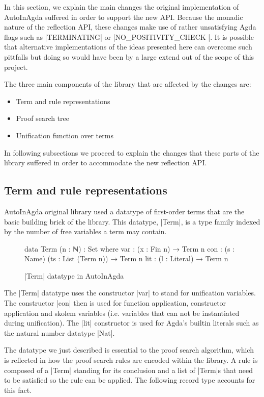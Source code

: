 \documentclass[a4paper]{article}
\begin{document}
In this section, we explain the main changes the original implementation of
AutoInAgda suffered in order to support the new API. Because the monadic nature
of the reflection API, these changes make use of rather unsatisfying Agda flags
such as |TERMINATING| or |NO_POSITIVITY_CHECK |. It is possible that
alternative implementations of the ideas presented here can overcome such
pittfalls but doing so would have been by a large extend out of the scope of
this project.

The three main components of the library that are affected by the changes are:

\begin{itemize}
    \item Term and rule representations
    \item Proof search tree
    \item Unification function over terms
\end{itemize}

In following subsections we proceed to explain the changes that these parts of
the library suffered in order to accommodate the new reflection API.

\subsection{Term and rule representations}

AutoInAgda original library used a datatype of first-order terms that are the
basic building brick of the library. This datatype, |Term|, is a type family
indexed by the number of free variables a term may contain.

\begin{figure}[h]
\small
\label{fig:term:AutoInAgda}
\begin{code}
  data Term (n : ℕ) : Set where
      var : (x : Fin n) → Term n
      con : (s : Name) (ts : List (Term n)) → Term n
      lit : (l : Literal) → Term n
\end{code}
  \caption{|Term| datatype in AutoInAgda}
\end{figure}

The |Term| datatype uses the constructor |var| to stand for unification
variables. The constructor |con| then is used for function application,
constructor application and skolem variables (i.e. variables that can not be
instantiated during unification). The |lit| constructor is used for Agda's
builtin literals such as the natural number datatype |Nat|.

The datatype we just described is essential to the proof search algorithm, which
is reflected in how the proof search rules are encoded within the library. A
rule is composed of a |Term| standing for its conclusion and a list of |Term|s
that need to be satisfied so the rule can be applied. The following record type
accounts for this fact.
\end{document}
